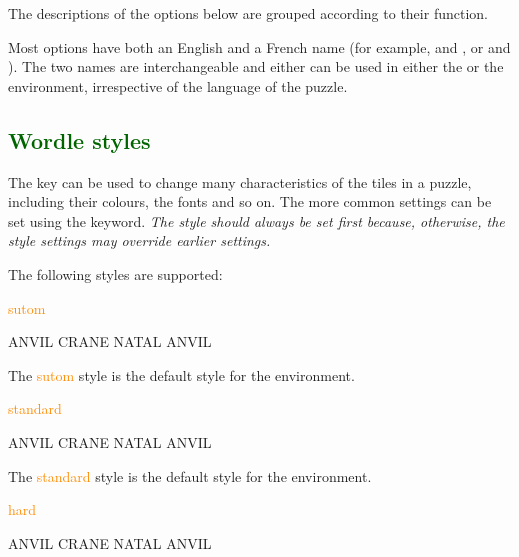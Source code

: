 \documentclass[svgnames]{report}
\newcommand\Section[1]{\subsection{\textcolor{DarkGreen}{#1}}}
\begin{document}
  The descriptions of the options below are grouped according to their
  function.

  Most options have both an English and a French name (for example,
   and , or  and
  ). The two names are interchangeable and either can be
  used in either the  or the 
  environment, irrespective of the language of the puzzle.

  \Section{Wordle styles}

  The  key can be used to change many characteristics of
  the tiles in a  puzzle, including their colours, the
  fonts and so on.  The more common settings can be set using the
   keyword. \textit{The style should always be set first
  because, otherwise, the style settings may override earlier settings.}

  The following styles are supported:

  \textcolor{DarkOrange}{sutom}

  \begin{example}
  \begin{wordle}[style=sutom]{ANVIL}
    CRANE
    NATAL
    ANVIL
  \end{wordle}
  \end{example}

  The \textcolor{DarkOrange}{sutom} style is the default
  style for the  environment.

  \textcolor{DarkOrange}{standard}

  \begin{example}
  \begin{wordle}[style=standard]{ANVIL}
    CRANE
    NATAL
    ANVIL
  \end{wordle}
  \end{example}

  The \textcolor{DarkOrange}{standard} style is the default style for the
   environment.

  \textcolor{DarkOrange}{hard}

  \begin{example}
  \begin{wordle}[style=hard]{ANVIL}
    CRANE
    NATAL
    ANVIL
  \end{wordle}
  \end{example}
\end{document}

